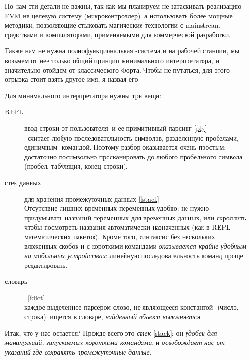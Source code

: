 Но нам эти детали не важны, так как мы планируем не затаскивать реализацию FVM
на целевую систему (микроконтроллер), а использовать более мощные методики,
позволяющие стыковать магические технологии с mainstream средствами и
компиляторами, применяемыми для коммерческой разработки.

Также нам не нужна полнофункциональная \F-система и на рабочей станции, мы
возьмем от нее только общий принцип минимального интерпретатора, и значительно
отойдем от классического Форта. Чтобы не путаться, для этого огрызка стоит взять
другое имя, я назвал его \pyf.


Для минимального интерпретатора нужны три вещи:
\begin{description}
\item[REPL] ввод строки от пользователя, и ее примитивный парсинг \ref{ply}\\
\F\ считает любую последовательность символов, разделенную пробелами,
единичным -командой. Поэтому разбор оказывается очень простым:
достаточно посимвольно просканировать  до любого пробельного
символа (пробел, табуляция, конец строки).
\item[стек данных] для хранения промежуточных данных \ref{fstack}\\
Отсутствие лишних временных переменных удобно: не нужно придумывать названий
переменных для временных данных, или скроллить чтобы посмотреть названия
автоматически назначенных (как в REPL математических пакетов). Кроме того,
синтаксис без нескольких вложенных скобок и с короткими командами
\textit{оказывается крайне удобным на мобильных устройствах}: линейную
последовательность команд проще редактировать.
\item[словарь]\ \ref{fdict}\\
каждое выделенное парсером слово, не являющееся константой-
(число, строка), ищется в словаре, \emph{найденный объект
выполняется}
\end{description}

\label{fstack}

Итак, что у нас остается? Прежде всего это \emph{стек} \ref{stack}: он
\textit{удобен для манипуляций, запускаемых короткими командами}, и
\emph{освобождает нас от указаний где сохранять промежуточные данные}.

\medskip
{}







\secup
